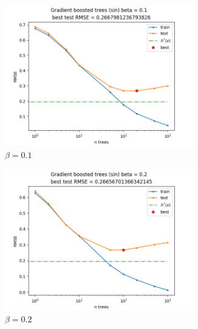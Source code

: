 \documentclass[12pt]{article}
\begin{document}
\begin{figure}[!h]
    \centering
    \begin{subfigure}[b]{0.49\textwidth}
        \centering
        \includegraphics[width=0.9\textwidth]{plots/03/01-sin-0-1.png}
        \caption{$\beta = 0.1$}
        \label{fig:03-sin-0.1}
    \end{subfigure}
    \begin{subfigure}[b]{0.49\textwidth}
        \centering
        \includegraphics[width=0.9\textwidth]{plots/03/01-sin-0-2.png}
        \caption{$\beta = 0.2$}
        \label{fig:03-sin-0.2}
    \end{subfigure}
    \begin{subfigure}[b]{0.49\textwidth}
        \centering

\end{subfigure}
\end{figure}
\end{document}
